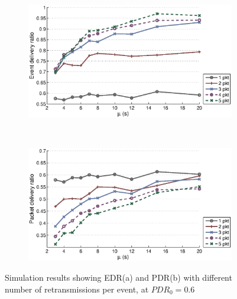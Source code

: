 \begin{figure}[p]
    \centering
    \begin{subfigure}[t]{0.7\textwidth}
        \centering
        \includegraphics[width=\textwidth] {../../sw/pc/matlab/simulation-result/retrans-count-edr-20min-pdr0.6.eps}
        \caption{}
    \end{subfigure} 
    \\
    \begin{subfigure}[t]{0.7\textwidth}
        \centering
        \includegraphics[width=\textwidth] {../../sw/pc/matlab/simulation-result/retrans-count-pdr-20min-pdr0.6.eps}
        \caption{}
    \end{subfigure}
    \caption[EDR and PDR with different transmission redundancy, $PDR_0 = 0.6$]{Simulation results showing EDR(a) and PDR(b) with different number of retransmissions per event, at $PDR_0 = 0.6$}\label{fig:retrans-lambda-0.6}
\end{figure}


